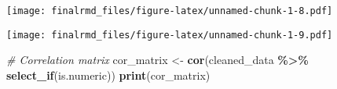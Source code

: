 \documentclass[
]{article}
\newenvironment{Shaded}{\begin{snugshade}}{\end{snugshade}}
\newcommand{\AttributeTok}[1]{\textcolor[rgb]{0.13,0.29,0.53}{#1}}
\newcommand{\CommentTok}[1]{\textcolor[rgb]{0.56,0.35,0.01}{\textit{#1}}}
\newcommand{\DecValTok}[1]{\textcolor[rgb]{0.00,0.00,0.81}{#1}}
\newcommand{\FunctionTok}[1]{\textcolor[rgb]{0.13,0.29,0.53}{\textbf{#1}}}
\newcommand{\NormalTok}[1]{#1}
\newcommand{\OtherTok}[1]{\textcolor[rgb]{0.56,0.35,0.01}{#1}}
\newcommand{\SpecialCharTok}[1]{\textcolor[rgb]{0.81,0.36,0.00}{\textbf{#1}}}
\newcommand{\StringTok}[1]{\textcolor[rgb]{0.31,0.60,0.02}{#1}}
\begin{document}
\texttt{[image: finalrmd\_files/figure-latex/unnamed-chunk-1-8.pdf]}

\begin{Shaded}
\end{Shaded}

\texttt{[image: finalrmd\_files/figure-latex/unnamed-chunk-1-9.pdf]}

\begin{Shaded}
\begin{Highlighting}[]
\CommentTok{\# Correlation matrix}
\NormalTok{cor\_matrix }\OtherTok{\textless{}{-}} \FunctionTok{cor}\NormalTok{(cleaned\_data }\SpecialCharTok{\%\textgreater{}\%} \FunctionTok{select\_if}\NormalTok{(is.numeric))}
\FunctionTok{print}\NormalTok{(cor\_matrix)}
\end{Highlighting}
\end{Shaded}
\end{document}
